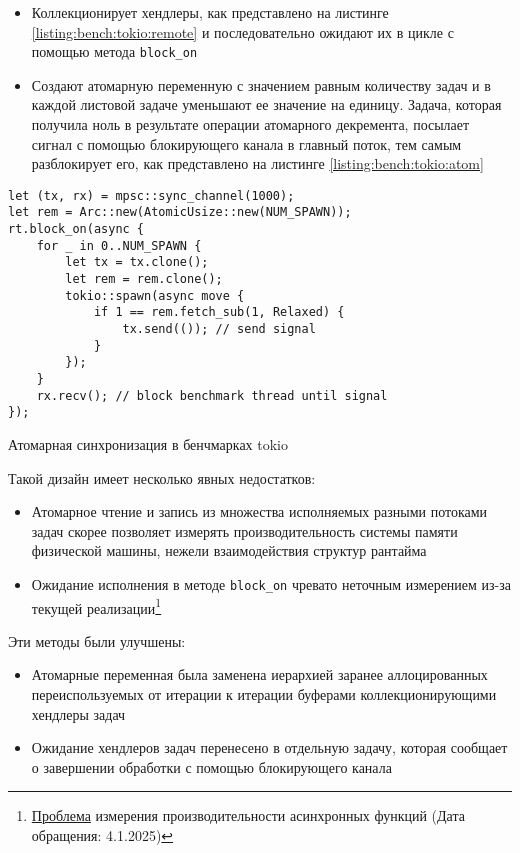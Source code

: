 \begin{itemize}
    \item Коллекционирует хендлеры, как представлено на листинге \ref{listing:bench:tokio:remote} и последовательно ожидают их в цикле с помощью метода \verb|block_on|
    \item Создают атомарную переменную с значением равным количеству задач и в каждой листовой задаче уменьшают ее значение на единицу. Задача, которая получила ноль в результате операции атомарного декремента, посылает сигнал с помощью блокирующего канала в главный поток, тем самым разблокирует его, как представлено на листинге \ref{listing:bench:tokio:atom}
\end{itemize}

\begin{listing}[H]
    \begin{verbatim}
let (tx, rx) = mpsc::sync_channel(1000);
let rem = Arc::new(AtomicUsize::new(NUM_SPAWN));
rt.block_on(async {
    for _ in 0..NUM_SPAWN {
        let tx = tx.clone();
        let rem = rem.clone();
        tokio::spawn(async move {
            if 1 == rem.fetch_sub(1, Relaxed) {
                tx.send(()); // send signal
            }
        });
    }
    rx.recv(); // block benchmark thread until signal
});
    \end{verbatim}

    \caption{Атомарная синхронизация в бенчмарках tokio}
    \label{listing:bench:tokio:atom}
\end{listing}

Такой дизайн имеет несколько явных недостатков:

\begin{itemize}
    \item Атомарное чтение и запись из множества исполняемых разными потоками задач скорее позволяет измерять производительность системы памяти физической машины, нежели взаимодействия структур рантайма
    \item Ожидание исполнения в методе \verb|block_on| чревато неточным измерением из-за текущей реализации\footnote{\href{https://github.com/bheisler/criterion.rs/issues/819}{Проблема} измерения производительности асинхронных функций (Дата обращения: 4.1.2025)}
\end{itemize}

Эти методы были улучшены:

\begin{itemize}
    \item Атомарные переменная была заменена иерархией заранее аллоцированных переиспользуемых от итерации к итерации буферами коллекционирующими хендлеры задач
    \item Ожидание хендлеров задач перенесено в отдельную задачу, которая сообщает о завершении обработки с помощью блокирующего канала
\end{itemize}

